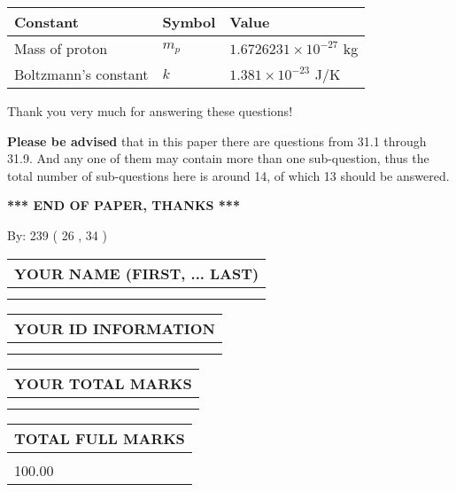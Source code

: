 \documentclass[12pt]{article}
\begin{document}
 
\noindent\begin{tabular}{|l|l|l|}
\hline
Constant & Symbol & Value \\
\hline
 
Mass of proton &
$m_p$ &
 $ 1.6726231 \times 10^{-27} $
kg \\
\hline
 
Boltzmann's constant &
$k$ &
 $ 1.381 \times 10^{-23} $
J/K \\
\hline
 
\end{tabular}
 
Thank you very much for answering these questions!
 
{\textbf{\large{Please be advised}}} that in this paper there are questions from
31.1 through
31.9.
And any one of them may contain more than one sub-question, thus the total number
of sub-questions here is around 14, of which
13 should be answered.
 
   
   
   
   
\vspace{1.0in} 
{\textbf{\large{ *** END OF PAPER, THANKS *** }}} 
   
   
\hspace{1.0in} By: 
         239 (          26 ,           34 )
   
   
   
   
\newpage 
\setcounter{page}{ 
    32001 } 
   
   
   
   
\noindent\begin{tabular}{|l|}
\hline
YOUR NAME (FIRST, ... LAST)  \\
\hline
 \\ 
 \\ 
\hline
\end{tabular}
\hspace{0.05in} \begin{tabular}{|l|}
\hline
 YOUR   ID   INFORMATION  \\
\hline
 \\ 
 \\ 
\hline
\end{tabular}
   
   
\vspace{0.2in}\noindent\begin{tabular}{|l|}
\hline
YOUR TOTAL MARKS  \\
\hline
 \\ 
 \\ 
\hline
\end{tabular}
\hspace{0.05in} \begin{tabular}{|l|}
\hline
TOTAL FULL MARKS  \\
\hline
 \\ 
100.00 \\
\hline
\end{tabular}
   
\end{document}
